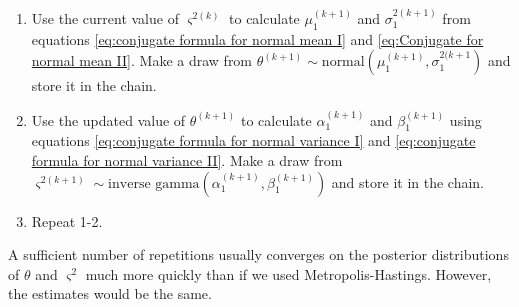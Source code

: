 \documentclass[11pt]{article}
\begin{document}
\begin{enumerate}
\item Use the current value of $\varsigma^{2(k)}$ to calculate $\mu_{1}^{(k+1)}$ and $\sigma_{1}^{2(k+1)}$ from equations \ref{eq:conjugate formula for normal mean I} and \ref{eq:Conjugate for normal mean II}. Make a draw from $\theta^{(k+1)}\sim\text{normal}\left(\mu_{1}^{(k+1)},\sigma_{1}^{2(k+1}\right)$ and store it in the chain.
\item Use the updated value of $\theta^{(k+1)}$ to calculate $\alpha_{1}^{(k+1)}$ and $\beta_{1}^{(k+1)}$ using equations \ref{eq:conjugate formula for normal variance I} and \ref{eq:conjugate formula for normal variance II}. Make a draw from $\varsigma^{2(k+1)}\sim\text{inverse gamma}\left(\alpha_{1}^{(k+1)},\beta_{1}^{(k+1)}\right)$ and store it in the chain. 
\item Repeat 1-2.
\end{enumerate}

A sufficient number of repetitions usually converges on the posterior distributions of $\theta$ and $\varsigma^{2}$ much more quickly than if we used Metropolis-Hastings. However, the estimates would be the same.
\end{document}
